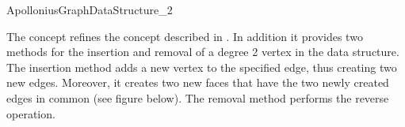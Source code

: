 

\begin{ccRefConcept}{ApolloniusGraphDataStructure_2}

\ccDefinition

The concept  refines the concept
described in . In addition
it provides two methods for the insertion and removal of a degree 2
vertex in the data structure. The insertion method adds a new vertex
to the specified edge, thus creating two new edges. Moreover, it
creates two new faces that have the two newly created edges in
common (see figure below). The removal method performs the reverse
operation.


\end{ccRefConcept}
